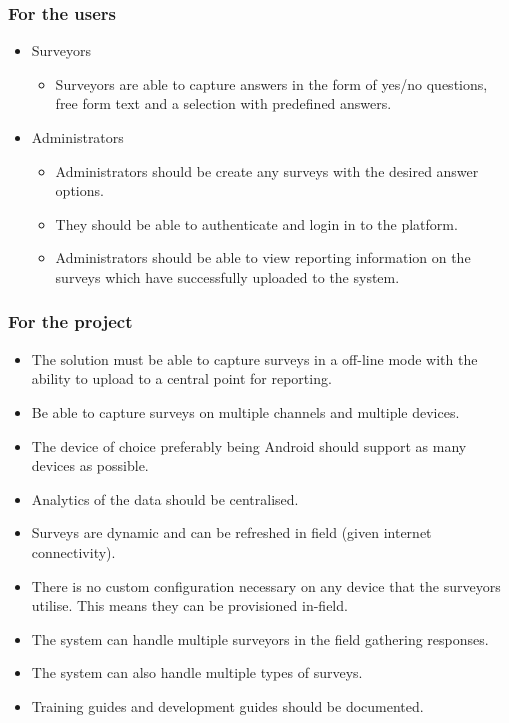\documentclass[12pt]{witseiepaper}
\begin{document}
\subsubsection{For the users}
\begin{itemize}
  \item Surveyors \begin{itemize}
  \item Surveyors are able to capture answers in the form of yes/no questions, free form text and a selection with predefined answers.
  \end{itemize}
    \item Administrators \begin{itemize}
  \item Administrators should be create any surveys with the desired answer options.
  \item They should be able to authenticate and login in to the platform.
  \item Administrators should be able to view reporting information on the surveys which have successfully uploaded to the system.
  \end{itemize}

\end{itemize}

\subsubsection{For the project}
\begin{itemize}
  \item The solution must be able to capture surveys in a off-line mode with the ability to upload to a central point for reporting.
  \item Be able to capture surveys on multiple channels and multiple devices.
  \item The device of choice preferably being Android should support as many devices as possible.
  \item Analytics of the data should be centralised.
  \item Surveys are dynamic and can be refreshed in field (given internet connectivity).
  \item There is no custom configuration necessary on any device that the surveyors utilise. This means they can be provisioned in-field.
  \item The system can handle multiple surveyors in the field gathering responses.
  \item The system can also handle multiple types of surveys.
  \item Training guides and development guides should be documented.
\end{itemize}
\end{document}
